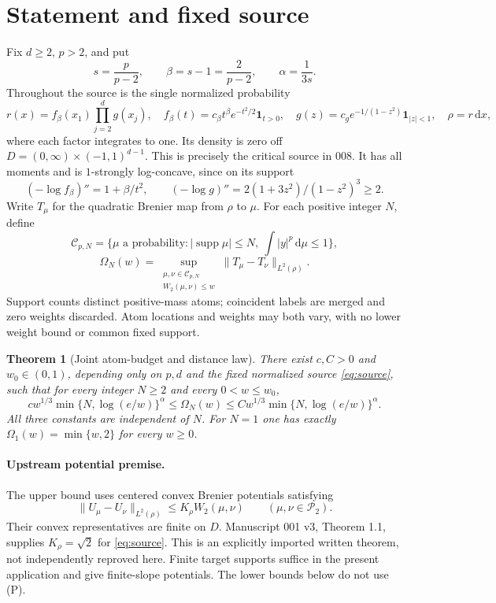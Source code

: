 \documentclass[11pt]{article}
\newtheorem{theorem}{Theorem}[section]
\theoremstyle{remark}\newtheorem{remark}[theorem]{Remark}
\newcommand{\ind}{\mathbf 1}\newcommand{\norm}[1]{\lVert#1\rVert}
\newcommand{\dd}{\,\mathrm d}\newcommand{\Ptwo}{\mathcal P_2}
\begin{document}
\section{Statement and fixed source}
Fix $d\ge2$, $p>2$, and put
\[
 s=\frac p{p-2},\qquad \beta=s-1=\frac2{p-2},\qquad \alpha=\frac1{3s}.
\]
Throughout the source is the single normalized probability
\begin{equation}\label{eq:source}
 r(x)=f_\beta(x_1)\prod_{j=2}^d g(x_j),\quad
 f_\beta(t)=c_\beta t^\beta e^{-t^2/2}\ind_{t>0},\quad
 g(z)=c_g e^{-1/(1-z^2)}\ind_{|z|<1},\quad \rho=r\dd x,
\end{equation}
where each factor integrates to one. Its density is zero off
$D=(0,\infty)\times(-1,1)^{d-1}$. This is precisely the critical source in 008. It has all moments and is $1$-strongly log-concave, since on its support
\[
 (-\log f_\beta)''=1+\beta/t^2,\qquad
 (-\log g)''=2(1+3z^2)/(1-z^2)^3\ge2.
\]
Write $T_\mu$ for the quadratic Brenier map from $\rho$ to $\mu$. For each positive integer $N$, define
\[
 \mathcal C_{p,N}=\{\mu\text{ a probability}:|\operatorname{supp}\mu|\le N,
                      \ \int |y|^p\dd\mu\le1\},
\]
\[
 \Omega_N(w)=\sup_{\substack{\mu,\nu\in\mathcal C_{p,N}\\W_2(\mu,\nu)\le w}}
                 \norm{T_\mu-T_\nu}_{L^2(\rho)}.
\]
Support counts distinct positive-mass atoms; coincident labels are merged and zero weights discarded. Atom locations and weights may both vary, with no lower weight bound or common fixed support.

\begin{theorem}[Joint atom-budget and distance law]\label{thm:main}
There exist $c,C>0$ and $w_0\in(0,1)$, depending only on $p,d$ and the fixed normalized source \eqref{eq:source}, such that for every integer $N\ge2$ and every $0<w\le w_0$,
\begin{equation}\label{eq:main}
 c w^{1/3}\min\{N,\log(e/w)\}^{\alpha}
 \le\Omega_N(w)\le
 C w^{1/3}\min\{N,\log(e/w)\}^{\alpha}.
\end{equation}
All three constants are independent of $N$. For $N=1$ one has exactly
$\Omega_1(w)=\min\{w,2\}$ for every $w\ge0$.
\end{theorem}

\paragraph{Upstream potential premise.}
The upper bound uses centered convex Brenier potentials satisfying
\begin{equation}\tag{P}\label{eq:P}
 \norm{U_\mu-U_\nu}_{L^2(\rho)}\le K_\rho W_2(\mu,\nu)
 \qquad(\mu,\nu\in\Ptwo).
\end{equation}
Their convex representatives are finite on $D$. Manuscript 001 v3, Theorem 1.1, supplies $K_\rho=\sqrt2$ for \eqref{eq:source}. This is an explicitly imported written theorem, not independently reproved here. Finite target supports suffice in the present application and give finite-slope potentials. The lower bounds below do not use (P).
\end{document}
